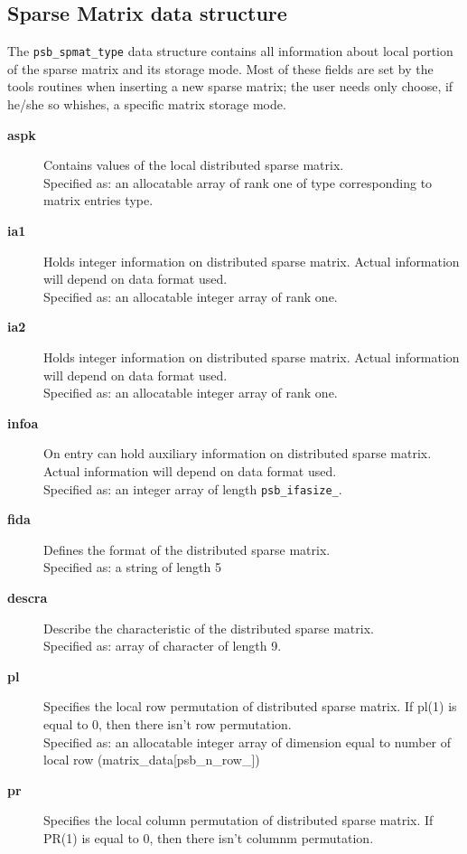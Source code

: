 \subsection{Sparse Matrix data structure}
\label{sec:spmat}
The \hypertarget{spdata}{{\tt psb\_spmat\_type}} data structure
contains all information about local portion of the sparse matrix and   
its storage mode. Most  of these fields are set  by the tools
routines when inserting a new sparse matrix; the user needs only
choose, if he/she so whishes, a specific matrix storage mode. \\
\begin{description}
\item[{\bf aspk}] Contains values of the local distributed sparse
matrix.\\
Specified as: an allocatable array of rank one of type corresponding
to matrix entries type.
\item[{\bf ia1}] Holds integer information on distributed sparse
matrix. Actual information will depend on data format used.\\
Specified as: an allocatable  integer array of rank one.
\item[{\bf ia2}] Holds integer information on distributed sparse
matrix. Actual information will depend on data format used.\\
Specified as: an allocatable  integer array of rank one.
\item[{\bf infoa}] On entry can hold auxiliary information on distributed sparse
matrix.  Actual information will depend on data format used.\\
Specified as: an integer array of length \verb|psb_ifasize_|.
\item[{\bf fida}] Defines the format of the distributed sparse matrix.\\
Specified as: a string of length 5
\item[{\bf descra}] Describe the characteristic of the distributed sparse matrix.\\
Specified as: array of character of length 9.
\item[{\bf pl}] Specifies the local row permutation of distributed sparse
matrix. If pl(1) is equal to 0, then there isn't row permutation.\\
Specified as: an allocatable integer array of dimension equal to number of local row (matrix\_data[psb\_n\_row\_\hbox{]})
\item[{\bf pr}] Specifies the local column permutation of distributed sparse
matrix. If PR(1) is equal to 0, then there isn't columnm permutation.\\

\end{description}
